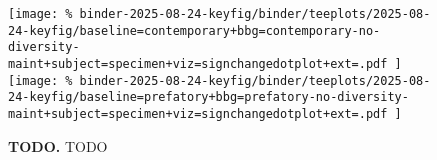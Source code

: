 \begin{figure*}

\texttt{[image: \%
binder-2025-08-24-keyfig/binder/teeplots/2025-08-24-keyfig/baseline=contemporary+bbg=contemporary-no-diversity-maint+subject=specimen+viz=signchangedotplot+ext=.pdf
]}%
\texttt{[image: \%
binder-2025-08-24-keyfig/binder/teeplots/2025-08-24-keyfig/baseline=prefatory+bbg=prefatory-no-diversity-maint+subject=specimen+viz=signchangedotplot+ext=.pdf
]}

\vspace{-1ex}

\caption{
\textbf{TODO.}
TODO
}

\label{fig:sign-change-nodmaint-vs-nodmaint}

\end{figure*}
